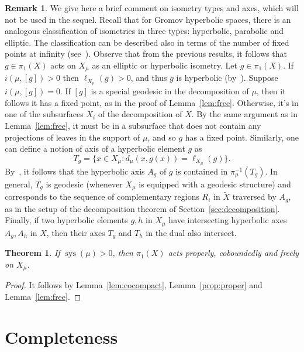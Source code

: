 \documentclass[12pt,article]{amsart}
\numberwithin{equation}{section}
\numberwithin{figure}{section}
\newtheorem{theorem}[equation]{Theorem}
\theoremstyle{definition}
\newtheorem{remark}[equation]{Remark}
\theoremstyle{plain}
\DeclareMathOperator{\sys}{sys}
\newcommand*{\wt}[1]{\widetilde{#1}}
\begin{document}
\begin{remark}
We give here a brief comment on isometry types and axes, which will not be used in the sequel.
Recall that for Gromov hyperbolic spaces, there is an analogous classification of isometries in three types: hyperbolic, parabolic and elliptic.
The classification can be described also in terms of the number of fixed points at infinity (see~\cite[Chapter~10]{CDR90:NotesGroupes}).
Observe that from the previous results, it follows that $g \in \pi_1(X)$ acts on $X_\mu$ as an elliptic or hyperbolic isometry.
Let $g \in \pi_1(X)$. If $i(\mu,[g])>0$ then $\ell_{X_{\mu}}(g)>0$, and thus $g$ is hyperbolic (by~\cite[2.2]{F15:Fujiwara}). Suppose $i(\mu,[g])=0$. If $[g]$ is a special geodesic in the decomposition of $\mu$, then it follows it has a fixed point, as in the proof of Lemma~\ref{lem:free}.
Otherwise, it's in one of the subsurfaces $X_i$ of the decomposition of $X$.
By the same argument as in Lemma~\ref{lem:free}, it must be in a subsurface that does not contain any projections of leaves in the support of $\mu$, and so $g$ has a fixed point.
Similarly, one can define a notion of axis of a hyperbolic element $g$ as
\[
T_g = \{ x \in X_{\mu} \colon d_{\mu}(x,g(x))=\ell_{X_{\mu}}(g)\}.
\]
By~\cite[Proposition~4.4]{MZ19:PositivelyRatioed}, it follows that the hyperbolic axis $A_g$ of $g$ is contained in $\pi_{\mu}^{-1}(T_g)$. In general, $T_g$ is geodesic (whenever $X_{\mu}$ is equipped with a geodesic structure) and corresponds to the sequence of complementary regions $R_i$ in $\wt{X}$ traversed by $A_g$, as in the setup of the decomposition theorem of Section~\ref{sec:decomposition}.
Finally, if two hyperbolic elements $g, h$ in $X_{\mu}$ have intersecting hyperbolic axes $A_g,A_h$ in $X$, then their axes $T_g$ and $T_h$ in the dual also intersect.
\end{remark}


\begin{theorem}
If $\sys(\mu)>0$, then $\pi_1(X)$ acts properly, coboundedly and freely on $X_{\mu}$.
\label{thm:geoaction}
\end{theorem}
\begin{proof}
It follows by Lemma~\ref{lem:cocompact}, Lemma~\ref{prop:proper} and Lemma~\ref{lem:free}.
\end{proof}


\section{Completeness}
\label{sec:completeness}
\end{document}
